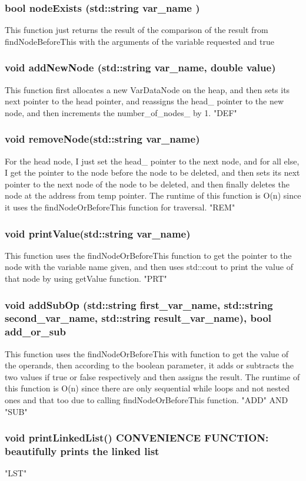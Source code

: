     \subsubsection{{\color{orange}bool} {\color{draculapurple}nodeExists}
    ({\color{orange}std::string} var\_name )}
    This function just returns the result of the comparison of the result from {\color{draculapurple}findNodeBeforeThis} with the arguments of the variable requested and true
    \subsubsection{{\color{orange}void} {\color{draculapurple}addNewNode}
    ({\color{orange}std::string} var\_name, {\color{orange}double} value)}
    This function first allocates a new VarDataNode on the heap, 
    and then sets its next pointer to the head pointer, and reassigns the 
    {\color{LimeGreen}head\_} pointer to the new node, and then increments 
    the {\color{LimeGreen}number\_of\_nodes\_} by 1. "DEF"
    \subsubsection{{\color{orange}void} {\color{draculapurple}removeNode}({\color{orange}std::string} var\_name)}
    For the head node, I just set the {\color{LimeGreen}head\_} pointer to the next node, 
    and for all else, I get the pointer to the node before the node to be deleted, and 
    then sets its next pointer to the next node of the node to be deleted, and then 
    finally deletes the node at the address from temp pointer. The runtime of this 
    function is {\color{lightblue}O(n)} since it uses the {\color{draculapurple}findNodeOrBeforeThis} function for traversal. 
    "REM"
    \subsubsection{{\color{orange}void} {\color{draculapurple}printValue}({\color{orange}std::string} var\_name)}
    This function uses the {\color{draculapurple}findNodeOrBeforeThis} function to 
    get the pointer to the node with the variable name given, and then uses 
    {\color{orange}std::cout} to print the value of that node by using 
    {\color{draculapurple}getValue} function. "PRT"
    \subsubsection{{\color{orange}void} {\color{draculapurple}addSubOp}
    ({\color{orange}std::string} first\_var\_name, 
    {\color{orange}std::string} second\_var\_name,\newline 
    {\color{orange}std::string} result\_var\_name), 
    {\color{orange}bool} add\_or\_sub}
    This function uses the {\color{draculapurple}findNodeOrBeforeThis} with function 
    to get the value of the operands, then according to the boolean parameter, it adds
    or subtracts the two values if true or false respectively and then assigns the result. 
    The runtime of this function is {\color{lightblue}O(n)} since there are only sequential 
    while loops and not nested ones and that too due to calling {\color{draculapurple}findNodeOrBeforeThis} function. "ADD" AND "SUB"
    \subsubsection{{\color{orange}void} {\color{draculapurple}printLinkedList}() {\color{awesome}CONVENIENCE FUNCTION:} {\color{yellow}beautifully prints the linked list}} 
    "LST"